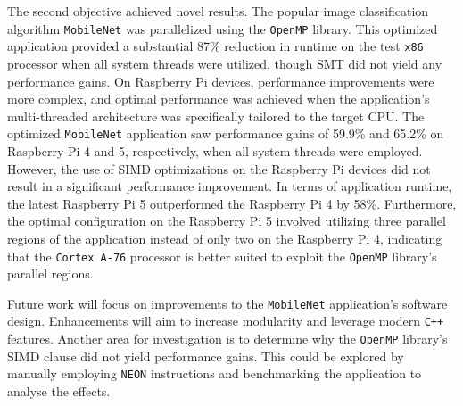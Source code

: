 The second objective achieved novel results. The popular image classification algorithm \texttt{MobileNet}\cite{mobilenet_paper}\cite{mobilenet_repo} was parallelized using the \texttt{OpenMP} library. This optimized application provided a substantial 87\% reduction in runtime on the test \texttt{x86} processor when all system threads were utilized, though SMT did not yield any performance gains. On Raspberry Pi devices, performance improvements were more complex, and optimal performance was achieved when the application's multi-threaded architecture was specifically tailored to the target CPU. The optimized \texttt{MobileNet} application saw performance gains of 59.9\% and 65.2\% on Raspberry Pi 4 and 5, respectively, when all system threads were employed. However, the use of SIMD optimizations on the Raspberry Pi devices did not result in a significant performance improvement. In terms of application runtime, the latest Raspberry Pi 5 outperformed the Raspberry Pi 4 by 58\%. Furthermore, the optimal configuration on the Raspberry Pi 5 involved utilizing three parallel regions of the application instead of only two on the Raspberry Pi 4, indicating that the \texttt{Cortex A-76} processor is better suited to exploit the \texttt{OpenMP} library's parallel regions.

Future work will focus on improvements to the \texttt{MobileNet} application’s software design. Enhancements will aim to increase modularity and leverage modern \texttt{C++} features. Another area for investigation is to determine why the \texttt{OpenMP} library's SIMD clause did not yield performance gains. This could be explored by manually employing \texttt{NEON} instructions and benchmarking the application to analyse the effects.

